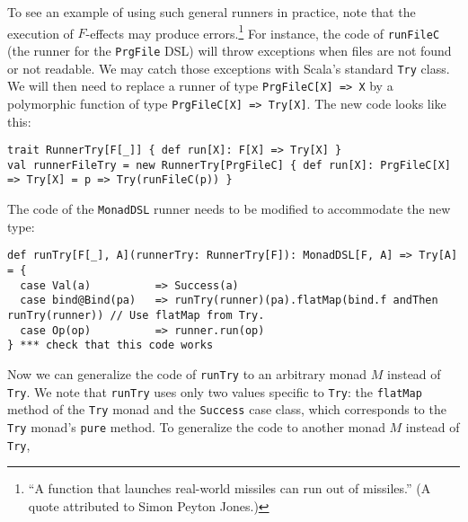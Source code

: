 To see an example of using such general runners in practice, note
that the execution of $F$-effects may produce errors.\footnote{\textsf{``}A function that launches real-world missiles can
run out of missiles.\textsf{''} (A quote attributed to Simon
Peyton Jones.)} For instance, the code of \lstinline!runFileC!
(the runner for the \lstinline!PrgFile!
DSL) will throw exceptions when files are not found or not readable.
We may catch those exceptions with Scala\textsf{'}s standard \lstinline!Try!
class. We will then need to replace a runner of type \lstinline!PrgFileC[X] => X!
by a polymorphic function of type \lstinline!PrgFileC[X] => Try[X]!.
The new code looks like this:
\begin{lstlisting}
trait RunnerTry[F[_]] { def run[X]: F[X] => Try[X] }
val runnerFileTry = new RunnerTry[PrgFileC] { def run[X]: PrgFileC[X] => Try[X] = p => Try(runFileC(p)) }
\end{lstlisting}
 The code of the \lstinline!MonadDSL!
runner needs to be modified to accommodate the new type:
\begin{lstlisting}
def runTry[F[_], A](runnerTry: RunnerTry[F]): MonadDSL[F, A] => Try[A] = {
  case Val(a)          => Success(a)
  case bind@Bind(pa)   => runTry(runner)(pa).flatMap(bind.f andThen runTry(runner)) // Use flatMap from Try.
  case Op(op)          => runner.run(op)
} *** check that this code works
\end{lstlisting}
Now we can generalize the code of \lstinline!runTry!
to an arbitrary monad $M$ instead of \lstinline!Try!.
We note that \lstinline!runTry!
uses only two values specific to \lstinline!Try!:
the \lstinline!flatMap!
method of the \lstinline!Try!
monad and the \lstinline!Success!
case class, which corresponds to the \lstinline!Try!
monad\textsf{'}s \lstinline!pure!
method. To generalize the code to another monad $M$ instead of \lstinline!Try!,
